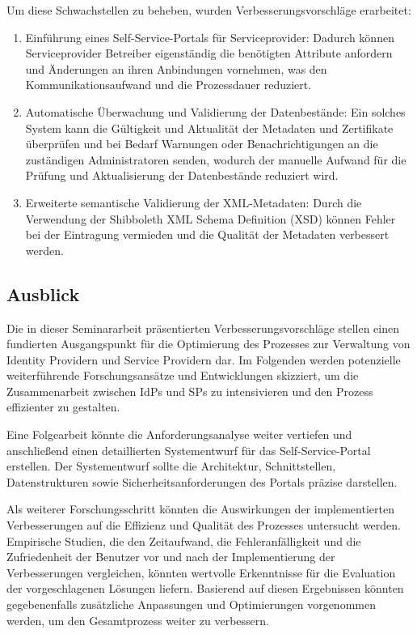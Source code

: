\documentclass[a4paper, fontsize=11pt]{scrartcl}
\begin{document}
Um diese Schwachstellen zu beheben, wurden Verbesserungsvorschläge erarbeitet:

\begin{enumerate}
    \item Einführung eines Self-Service-Portals für Serviceprovider: Dadurch können Serviceprovider Betreiber eigenständig die benötigten Attribute anfordern und Änderungen an ihren Anbindungen vornehmen, was den Kommunikationsaufwand und die Prozessdauer reduziert.
    \item Automatische Überwachung und Validierung der Datenbestände: Ein solches System kann die Gültigkeit und Aktualität der Metadaten und Zertifikate überprüfen und bei Bedarf Warnungen oder Benachrichtigungen an die zuständigen Administratoren senden, wodurch der manuelle Aufwand für die Prüfung und Aktualisierung der Datenbestände reduziert wird.
    \item Erweiterte semantische Validierung der XML-Metadaten: Durch die Verwendung der Shibboleth XML Schema Definition (XSD) können Fehler bei der Eintragung vermieden und die Qualität der Metadaten verbessert werden.
\end{enumerate}

\subsection{Ausblick}\label{subsec:outlook}
Die in dieser Seminararbeit präsentierten Verbesserungsvorschläge stellen einen fundierten Ausgangspunkt für die Optimierung des Prozesses zur Verwaltung von Identity Providern und Service Providern dar.
Im Folgenden werden potenzielle weiterführende Forschungsansätze und Entwicklungen skizziert, um die Zusammenarbeit zwischen IdPs und SPs zu intensivieren und den Prozess effizienter zu gestalten.

Eine Folgearbeit könnte die Anforderungsanalyse weiter vertiefen und anschließend einen detaillierten Systementwurf für das Self-Service-Portal erstellen.
Der Systementwurf sollte die Architektur, Schnittstellen, Datenstrukturen sowie Sicherheitsanforderungen des Portals präzise darstellen.

Als weiterer Forschungsschritt könnten die Auswirkungen der implementierten Verbesserungen auf die Effizienz und Qualität des Prozesses untersucht werden.
Empirische Studien, die den Zeitaufwand, die Fehleranfälligkeit und die Zufriedenheit der Benutzer vor und nach der Implementierung der Verbesserungen vergleichen, könnten wertvolle Erkenntnisse für die Evaluation der vorgeschlagenen Lösungen liefern.
Basierend auf diesen Ergebnissen könnten gegebenenfalls zusätzliche Anpassungen und Optimierungen vorgenommen werden, um den Gesamtprozess weiter zu verbessern.

\newpage

\printbibliography{}
\listoffigures
\end{document}
